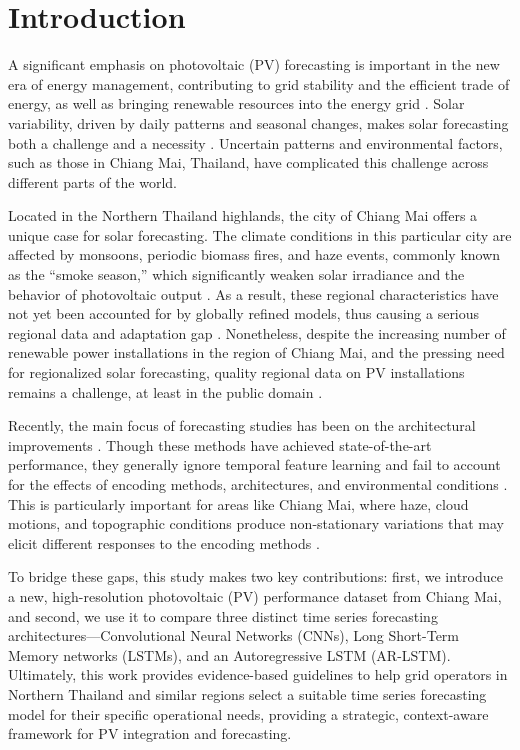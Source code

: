 \documentclass[conference]{IEEEtran}
\begin{document}
	\section{Introduction}
	A significant emphasis on photovoltaic (PV) forecasting is important in the new era of energy management, contributing to grid stability and the efficient trade of energy, as well as bringing renewable resources into the energy grid \cite{Ahmed2020}. Solar variability, driven by daily patterns and seasonal changes, makes solar forecasting both a challenge and a necessity \cite{Antonanzas2016}. Uncertain patterns and environmental factors, such as those in Chiang Mai, Thailand, have complicated this challenge across different parts of the world.
	
	Located in the Northern Thailand highlands, the city of Chiang Mai offers a unique case for solar forecasting. The climate conditions in this particular city are affected by monsoons, periodic biomass fires, and haze events, commonly known as the ``smoke season,'' which significantly weaken solar irradiance and the behavior of photovoltaic output \cite{Amnuaylojaroen2020}. As a result, these regional characteristics have not yet been accounted for by globally refined models, thus causing a serious regional data and adaptation gap \cite{Seng2021}. Nonetheless, despite the increasing number of renewable power installations in the region of Chiang Mai, and the pressing need for regionalized solar forecasting, quality regional data on PV installations remains a challenge, at least in the public domain \cite{ASEAN2022}.
	
	Recently, the main focus of forecasting studies has been on the architectural improvements \cite{Wang2022}. Though these methods have achieved state-of-the-art performance, they generally ignore temporal feature learning and fail to account for the effects of encoding methods, architectures, and environmental conditions \cite{Cerqueira2020}. This is particularly important for areas like Chiang Mai, where haze, cloud motions, and topographic conditions produce non-stationary variations that may elicit different responses to the encoding methods \cite{Prasertsan2021}.
	
	To bridge these gaps, this study makes two key contributions: first, we introduce a new, high-resolution photovoltaic (PV) performance dataset from Chiang Mai, and second, we use it to compare three distinct time series forecasting architectures—Convolutional Neural Networks (CNNs), Long Short-Term Memory networks (LSTMs), and an Autoregressive LSTM (AR-LSTM). Ultimately, this work provides evidence-based guidelines to help grid operators in Northern Thailand and similar regions select a suitable time series forecasting model for their specific operational needs, providing a strategic, context-aware framework for PV integration and forecasting.
		
\end{document}

